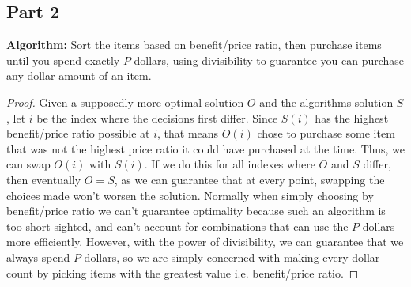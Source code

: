 \documentclass[11pt]{article}
\begin{document}
\subsection*{Part 2}
\textbf{Algorithm:} Sort the items based on benefit/price ratio, then purchase items until you spend exactly $P$ dollars, using divisibility to guarantee you can purchase any dollar amount of an item.
\begin{proof}
Given a supposedly more optimal solution $O$ and the algorithms solution $S$, let $i$ be the index where the decisions first differ. Since $S(i)$ has the highest benefit/price ratio possible at $i$, that means $O(i)$ chose to purchase some item that was not the highest price ratio it could have purchased at the time. Thus, we can swap $O(i)$ with $S(i)$. If we do this for all indexes where $O$ and $S$ differ, then eventually $O = S$, as we can guarantee that at every point, swapping the choices made won't worsen the solution. Normally when simply choosing by benefit/price ratio we can't guarantee optimality because such an algorithm is too short-sighted, and can't account for combinations that can use the $P$ dollars more efficiently. However, with the power of divisibility, we can guarantee that we always spend $P$ dollars, so we are simply concerned with making every dollar count by picking items with the greatest value i.e. benefit/price ratio.
\end{proof}
\end{document}
